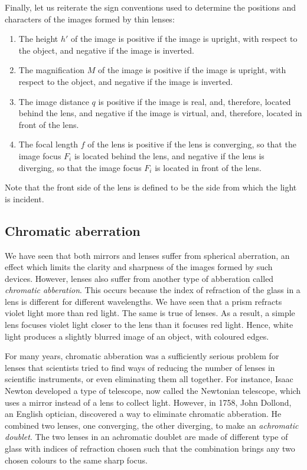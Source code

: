 Finally, let us reiterate the sign conventions used to determine
 the positions and characters of the images formed by thin lenses:
\begin{enumerate}
\item The height $h'$ of the image is positive if the image is
upright, with respect to the object, and negative if the image
is inverted. 
\item The magnification $M$ of the image is positive if the image is
upright, with respect to the object, and negative if the image
is inverted. 
\item The image distance $q$ is positive if the image is real, and,
therefore, located behind the lens, and  negative if the
image is virtual, and, therefore, located in front of the lens. 
\item The focal length $f$  of
the lens  is positive if the lens is converging, so that the image focus
 $F_i$ is located behind the
lens, and negative if the lens is diverging, so that the
image focus
 $F_i$  is located in front of the lens.
\end{enumerate}
Note that  the front side of the lens is defined
to be  the side from which the light is incident. 

\subsection{Chromatic aberration}
We have seen that both mirrors and lenses suffer from spherical
aberration, an effect which limits the clarity and sharpness of the
images formed by such devices. However, lenses also suffer from another
type of abberation called {\em chromatic abberation}. This occurs
because the index of refraction of the glass in a lens is different for
different wavelengths. We have seen that a prism refracts violet light
more than red light. The same is true of lenses. As a result, a simple
lens focuses violet light closer to the lens than it focuses
red light. Hence, white light  produces a slightly blurred image of
an object, with coloured edges. 

For many years, chromatic abberation was a sufficiently serious 
problem for lenses that scientists tried to find ways of reducing
the number of lenses in scientific instruments,
or even eliminating them all together. For instance, Isaac Newton
developed a type of telescope, now called the
Newtonian telescope,  which uses a mirror instead of a lens to collect
light. However, in 1758, John Dollond, an English optician, discovered
a way to eliminate chromatic abberation. He combined two lenses,
one converging, the other diverging, to make an {\em achromatic
doublet}. The two lenses in an achromatic
doublet are made of different type of glass with indices of refraction
chosen such that the combination brings any two chosen colours to the
same sharp focus. 

